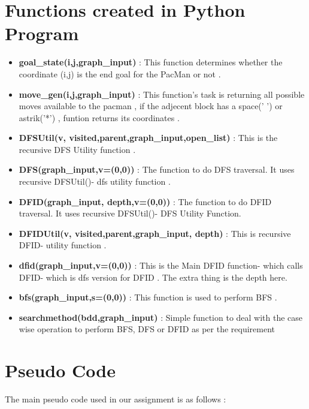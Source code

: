 \documentclass{article}
\begin{document}
\section{Functions created in Python Program}
\vspace{20pt}
\begin{itemize}
    \item \textbf{goal\_state(i,j,graph\_input)} : This function determines whether the coordinate (i,j) is the end goal for the PacMan or not .
    \item \textbf{move\_gen(i,j,graph\_input)} : This function's task is returning all possible moves available to the pacman
    , if the adjecent block has a space(' ') or astrik('*') 
    , funtion returns its coordinates .
    \item \textbf{DFSUtil(v, visited,parent,graph\_input,open\_list)} : This is the recursive DFS Utility function .
    \item \textbf{DFS(graph\_input,v=(0,0))} : The function to do DFS traversal. It uses recursive DFSUtil()- dfs utility function .
    \item \textbf{DFID(graph\_input, depth,v=(0,0))} : The function to do DFID traversal. It uses recursive DFSUtil()- DFS Utility Function.
    \item \textbf{DFIDUtil(v, visited,parent,graph\_input, depth)} : This is recursive DFID- utility function .
    \item \textbf{dfid(graph\_input,v=(0,0))} :  This is the Main DFID function- which calls DFID- which is dfs version for DFID . The extra thing is the depth here.
    \item \textbf{bfs(graph\_input,s=(0,0))} : This function is used to perform BFS .
    \item \textbf{searchmethod(bdd,graph\_input)} : Simple function to deal with the case wise operation to perform BFS, DFS or DFID as per the requirement
\end{itemize}
\newpage
\section{Pseudo Code}
The main pseudo code used in our assignment is as follows :
\end{document}
